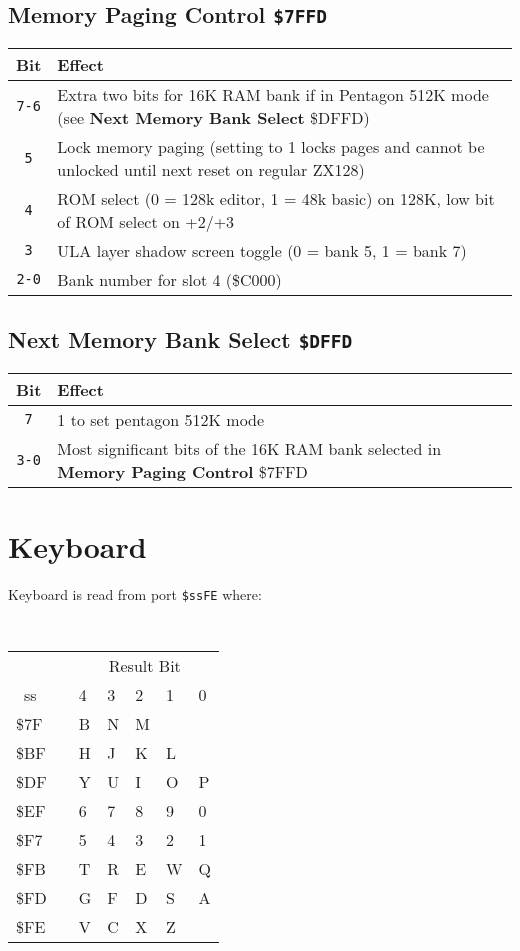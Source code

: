 \documentclass[oneside,a4paper]{book}
\newcommand{\instrt}{\rule{0pt}{2.7ex}}
\newcommand{\instrb}{\rule[-1.7ex]{0pt}{0pt}}
\newcommand{\notet}{\rule{0pt}{2.4ex}}
\begin{document}
\subsection{Memory Paging Control {\tt \$7FFD}}

\begin{tabular}{cp{12cm}}
	Bit & Effect \\
	\hline
	{\tt 7-6}\notet & 
		Extra two bits for 16K RAM bank if in Pentagon 512K mode (see \textbf{Next Memory Bank Select} \$DFFD) \\
	{\tt 5}\notet &
		Lock memory paging (setting to 1 locks pages and cannot be unlocked until next reset on regular ZX128) \\
	{\tt 4}\notet &
		ROM select (0 = 128k editor, 1 = 48k basic) on 128K, low bit of ROM select on +2/+3 \\
	{\tt 3}\notet &
		ULA layer shadow screen toggle (0 = bank 5, 1 = bank 7) \\
	{\tt 2-0}\notet &
		Bank number for slot 4 (\$C000) \\
\end{tabular}

\subsection{Next Memory Bank Select {\tt \$DFFD}}

\begin{tabular}{cp{12cm}}
	Bit & Effect \\
	\hline
	{\tt 7}\notet & 
		1 to set pentagon 512K mode \\
	{\tt 3-0}\notet &
		Most significant bits of the 16K RAM bank selected in \textbf{Memory Paging Control} \$7FFD  \\
\end{tabular}

\pagebreak
\section{Keyboard}
\label{zx_next_keyboard}

Keyboard is read from port {\tt \$ssFE} where:

{\tt 
	\begin{tabular}{p{0.7cm}|cp{1cm}p{1cm}p{1cm}p{1.2cm}p{1.2cm}}

		   & & \multicolumn{5}{c}{Result Bit} \\
		~ss & & 4 & 3 & 2 & 1 & 0 \instrb \\
		\hline
		\$7F\instrt & & B & N & M & \fbox{Symb} & \fbox{Space} \\
		\$BF\instrt & & H & J & K & L & \fbox{Enter} \\
		\$DF\instrt & & Y & U & I & O & P \\
		\$EF\instrt & & 6 & 7 & 8 & 9 & 0 \\
		\$F7\instrt & & 5 & 4 & 3 & 2 & 1 \\
		\$FB\instrt & & T & R & E & W & Q \\
		\$FD\instrt & & G & F & D & S & A \\
		\$FE\instrt\instrb & & V & C & X & Z & \fbox{Caps} \\

	\end{tabular}
}
\end{document}
